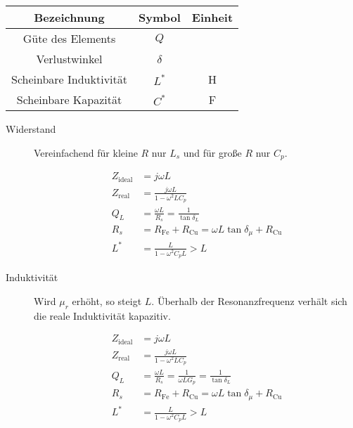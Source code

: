 \begin{center}
\begin{tabular}{ccc} \toprule
Bezeichnung & Symbol & Einheit \\ \midrule
Güte des Elements & $Q$ & \\
Verlustwinkel & $\delta$ & \\
Scheinbare Induktivität & $L^*$ & \si{\henry} \\
Scheinbare Kapazität & $C^*$ & \si{\farad} \\
\bottomrule
\end{tabular}
\end{center}

\begin{description}
\item[Widerstand] Vereinfachend für kleine $R$ nur $L_s$ und für große $R$ nur $C_p$.
\begin{center}
\begin{circuitikz}[scale=0.5, every node/.style={scale=1}]

\end{circuitikz}
\end{center}
\begin{align*}
Z_\text{ideal} &= j \omega L \\
Z_\text{real} &= \frac{j\omega L}{1 - \omega^2 LC_p} \\
Q_L &= \frac{\omega L}{R_s} = \frac{1}{\tan \delta_L} \\
R_s &= R_\text{Fe} + R_\text{Cu} = \omega L \tan\delta_\mu + R_\text{Cu} \\
L^* &= \frac{L}{1-\omega^2 C_p L} > L
\end{align*}

\item[Induktivität] Wird $\mu_r$ erhöht, so steigt $L$. Überhalb der Resonanzfrequenz verhält sich die reale Induktivität kapazitiv.
\begin{center}
\begin{circuitikz}[scale=0.5, every node/.style={scale=1}]

\end{circuitikz}
\end{center}
\begin{align*}
Z_\text{ideal} &= j \omega L \\
Z_\text{real} &= \frac{j\omega L}{1 - \omega^2 LC_p} \\
Q_L &= \frac{\omega L}{R_s} = \frac{1}{\omega L G_p} = \frac{1}{\tan \delta_L} \\
R_s &= R_\text{Fe} + R_\text{Cu} = \omega L \tan\delta_\mu + R_\text{Cu} \\
L^* &= \frac{L}{1-\omega^2 C_p L} > L
\end{align*}


\end{description}
